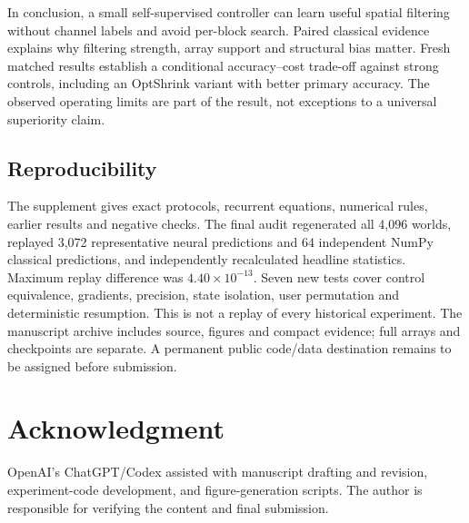 \documentclass[10pt,journal,letterpaper]{IEEEtran}
\begin{document}
In conclusion, a small self-supervised controller can learn useful spatial filtering without channel labels and avoid per-block search. Paired classical evidence explains why filtering strength, array support and structural bias matter. Fresh matched results establish a conditional accuracy--cost trade-off against strong controls, including an OptShrink variant with better primary accuracy. The observed operating limits are part of the result, not exceptions to a universal superiority claim.

\subsection{Reproducibility}
The supplement gives exact protocols, recurrent equations, numerical rules, earlier results and negative checks. The final audit regenerated all 4,096 worlds, replayed 3,072 representative neural predictions and 64 independent NumPy classical predictions, and independently recalculated headline statistics. Maximum replay difference was $4.40\times10^{-13}$. Seven new tests cover control equivalence, gradients, precision, state isolation, user permutation and deterministic resumption. This is not a replay of every historical experiment. The manuscript archive includes source, figures and compact evidence; full arrays and checkpoints are separate. A permanent public code/data destination remains to be assigned before submission.

\section*{Acknowledgment}
OpenAI's ChatGPT/Codex assisted with manuscript drafting and revision, experiment-code development, and figure-generation scripts. The author is responsible for verifying the content and final submission.


\end{document}

